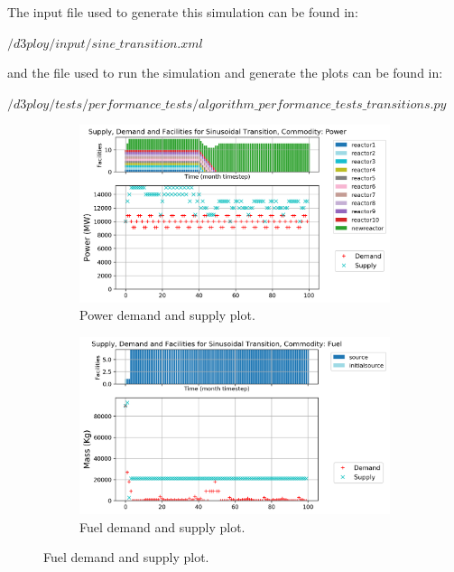 \documentclass[11pt,letterpaper]{article}
\begin{document}
The input file used to generate this simulation can be found in:

\noindent
$/d3ploy/input/sine\_transition.xml$

\noindent
and the file used to run the simulation and generate the plots can be found in:

\noindent
$/d3ploy/tests/performance\_tests/algorithm\_performance\_tests\_transitions.py$

\begin{figure}[!htbp]
    \centering
    \begin{subfigure}[t]{\textwidth}
    \centering
        \includegraphics[width=\linewidth]{figures/sinetransition-power.png} 
        \caption{Power demand and supply plot.}
        \label{fig:sinetransition-power}
    \end{subfigure}
    \vspace{1cm}
    \begin{subfigure}[t]{0.45\textwidth}
        \centering
        \includegraphics[width=\linewidth]{figures/sinetransition-fuel.png} 
        \caption{Fuel demand and supply plot.}
	    \label{fig:sinetransition-fuel}

\end{subfigure}
\end{figure}
\end{document}
